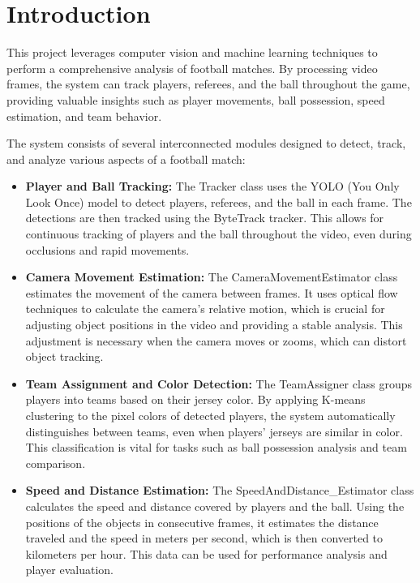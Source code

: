 \section{Introduction}
\label{sec:intro}

This project leverages computer vision and machine learning techniques to perform a comprehensive analysis of football matches. By processing video frames, the system can track players, referees, and the ball throughout the game, providing valuable insights such as player movements, ball possession, speed estimation, and team behavior.

The system consists of several interconnected modules designed to detect, track, and analyze various aspects of a football match:

\begin{itemize}
    \item \textbf{Player and Ball Tracking:} The Tracker class uses the YOLO (You Only Look Once) model to detect players, referees, and the ball in each frame. The detections are then tracked using the ByteTrack tracker. This allows for continuous tracking of players and the ball throughout the video, even during occlusions and rapid movements.
    
    \item \textbf{Camera Movement Estimation:} The CameraMovementEstimator class estimates the movement of the camera between frames. It uses optical flow techniques to calculate the camera's relative motion, which is crucial for adjusting object positions in the video and providing a stable analysis. This adjustment is necessary when the camera moves or zooms, which can distort object tracking.
    
    \item \textbf{Team Assignment and Color Detection:} The TeamAssigner class groups players into teams based on their jersey color. By applying K-means clustering to the pixel colors of detected players, the system automatically distinguishes between teams, even when players' jerseys are similar in color. This classification is vital for tasks such as ball possession analysis and team comparison.
    
    \item \textbf{Speed and Distance Estimation:} The SpeedAndDistance\_Estimator class calculates the speed and distance covered by players and the ball. Using the positions of the objects in consecutive frames, it estimates the distance traveled and the speed in meters per second, which is then converted to kilometers per hour. This data can be used for performance analysis and player evaluation.
    

\end{itemize}
